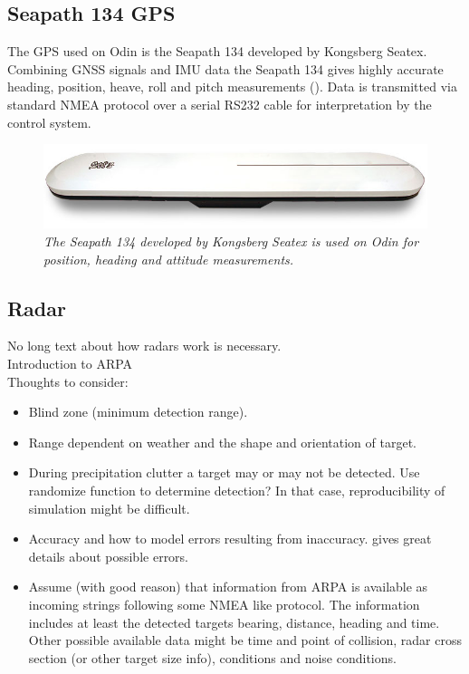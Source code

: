 \subsection{Seapath 134 GPS}
The GPS used on Odin is the Seapath 134 developed by Kongsberg Seatex. Combining GNSS signals and IMU data the Seapath 134 gives highly accurate heading, position, heave, roll and pitch measurements (\cite{SeapathManual}). Data is transmitted via standard NMEA protocol over a serial RS232 cable for interpretation by the control system.

\begin{figure}[H]
	\begin{center}
		\includegraphics[width = 0.7\linewidth]{fig/Seapath130.jpg}
		\caption{\textit{The Seapath 134 developed by Kongsberg Seatex is used on Odin for position, heading and attitude measurements.}}
		\label{fig:seapath130}
	\end{center}
\end{figure}

\subsection{Radar}
No long text about how radars work is necessary.\\
Introduction to ARPA\\
Thoughts to consider:
\begin{itemize}
	\item Blind zone (minimum detection range).
	\item Range dependent on weather and the shape and orientation of target.
	\item During precipitation clutter a target may or may not be detected. Use randomize function to determine detection? In that case, reproducibility of simulation might be difficult.
	\item Accuracy and how to model errors resulting from inaccuracy.
	\subitem \cite{ARPAmanual} gives great details about possible errors.
	\item Assume (with good reason) that information from ARPA is available as incoming strings following some NMEA like protocol. The information includes at least the detected targets bearing, distance, heading and time. Other possible available data might be time and point of collision, radar cross section (or other target size info), conditions and noise conditions.
\end{itemize}

